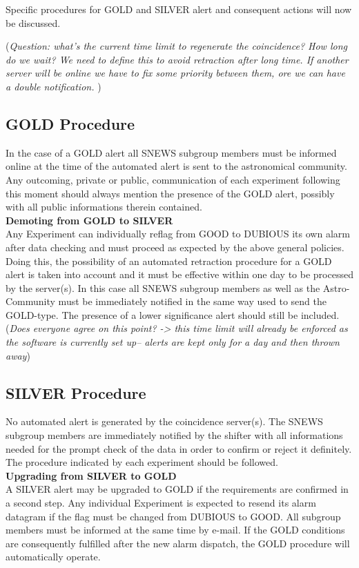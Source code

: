 \documentclass{article}
\begin{document}
Specific procedures for GOLD and SILVER alert and consequent actions 
will now be discussed.

({\it Question: what's the current time limit to regenerate the coincidence?
How long do we wait? We need to define this to avoid retraction after long 
time. If another server will be online we have to fix some priority between 
them, ore we can have a double notification.
})

\subsection{GOLD Procedure}\label{GOLD}

In the case of a GOLD alert all SNEWS subgroup members must be informed
online at the time of the automated alert is sent to the astronomical
community.
Any outcoming, private or public, communication of each experiment following 
this moment should always 
mention the presence of the GOLD alert, possibly with all public informations
therein contained.\\

{\bf Demoting from GOLD to SILVER}\\ Any Experiment can individually
reflag from GOOD to DUBIOUS its own alarm after data checking and must
proceed as expected by the above general policies.  Doing this, the
possibility of an automated retraction procedure for a GOLD alert is
taken into account and it must be effective within one day to be
processed by the server(s). In this case all SNEWS subgroup
members as well as the Astro-Community must be immediately notified in
the same way used to send the GOLD-type. The presence of a lower
significance alert should still be included.({\it Does everyone agree
on this point? -> this time limit will already be enforced as
the software is currently set up-- alerts are kept only for a day
and then thrown away})

\subsection{SILVER Procedure}\label{SILVER}
No automated alert is generated by the coincidence server(s). 
The SNEWS subgroup members are immediately notified by the shifter 
with all informations needed for the prompt check of the data in order to 
confirm or reject it definitely.
The procedure indicated by each experiment should be followed.\\


\textbf{Upgrading from SILVER to GOLD}\\
A SILVER alert may be upgraded to GOLD if the requirements are
confirmed in a second step. Any individual Experiment is expected to
resend its alarm datagram if the flag must be changed from DUBIOUS to
GOOD. All subgroup members must be informed at the same time by
e-mail. If the GOLD conditions are consequently fulfilled after the
new alarm dispatch, the GOLD procedure will automatically operate.
\end{document}
